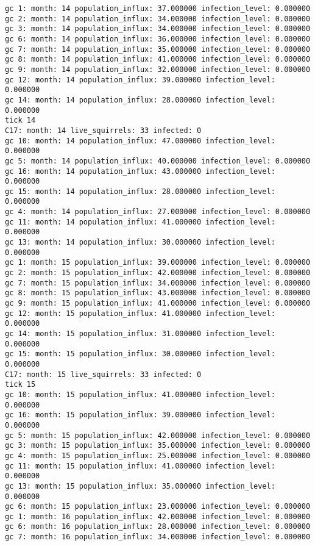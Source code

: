 \begin{lstlisting}[basicstyle=\small]
gc 1: month: 14 population_influx: 37.000000 infection_level: 0.000000
gc 2: month: 14 population_influx: 34.000000 infection_level: 0.000000
gc 3: month: 14 population_influx: 34.000000 infection_level: 0.000000
gc 6: month: 14 population_influx: 36.000000 infection_level: 0.000000
gc 7: month: 14 population_influx: 35.000000 infection_level: 0.000000
gc 8: month: 14 population_influx: 41.000000 infection_level: 0.000000
gc 9: month: 14 population_influx: 32.000000 infection_level: 0.000000
gc 12: month: 14 population_influx: 39.000000 infection_level: 0.000000
gc 14: month: 14 population_influx: 28.000000 infection_level: 0.000000
tick 14
C17: month: 14 live_squirrels: 33 infected: 0
gc 10: month: 14 population_influx: 47.000000 infection_level: 0.000000
gc 5: month: 14 population_influx: 40.000000 infection_level: 0.000000
gc 16: month: 14 population_influx: 43.000000 infection_level: 0.000000
gc 15: month: 14 population_influx: 28.000000 infection_level: 0.000000
gc 4: month: 14 population_influx: 27.000000 infection_level: 0.000000
gc 11: month: 14 population_influx: 41.000000 infection_level: 0.000000
gc 13: month: 14 population_influx: 30.000000 infection_level: 0.000000
gc 1: month: 15 population_influx: 39.000000 infection_level: 0.000000
gc 2: month: 15 population_influx: 42.000000 infection_level: 0.000000
gc 7: month: 15 population_influx: 34.000000 infection_level: 0.000000
gc 8: month: 15 population_influx: 43.000000 infection_level: 0.000000
gc 9: month: 15 population_influx: 41.000000 infection_level: 0.000000
gc 12: month: 15 population_influx: 41.000000 infection_level: 0.000000
gc 14: month: 15 population_influx: 31.000000 infection_level: 0.000000
gc 15: month: 15 population_influx: 30.000000 infection_level: 0.000000
C17: month: 15 live_squirrels: 33 infected: 0
tick 15
gc 10: month: 15 population_influx: 41.000000 infection_level: 0.000000
gc 16: month: 15 population_influx: 39.000000 infection_level: 0.000000
gc 5: month: 15 population_influx: 42.000000 infection_level: 0.000000
gc 3: month: 15 population_influx: 35.000000 infection_level: 0.000000
gc 4: month: 15 population_influx: 25.000000 infection_level: 0.000000
gc 11: month: 15 population_influx: 41.000000 infection_level: 0.000000
gc 13: month: 15 population_influx: 35.000000 infection_level: 0.000000
gc 6: month: 15 population_influx: 23.000000 infection_level: 0.000000
gc 1: month: 16 population_influx: 42.000000 infection_level: 0.000000
gc 6: month: 16 population_influx: 28.000000 infection_level: 0.000000
gc 7: month: 16 population_influx: 34.000000 infection_level: 0.000000

\end{lstlisting}
